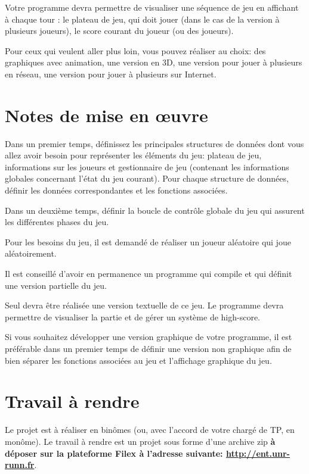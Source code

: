 \documentclass[10pt]{article}
\begin{document}
Votre programme devra permettre de visualiser une séquence de jeu en affichant à chaque tour : le plateau de jeu, qui doit jouer (dans le cas de la version à plusieurs joueurs), le score courant du joueur (ou des joueurs).

Pour ceux qui veulent aller plus loin, vous pouvez réaliser au choix: des graphiques avec animation, une version en 3D, une version pour jouer à plusieurs en réseau, une version pour jouer à plusieurs sur Internet.

\section{Notes de mise en {\oe}uvre}

Dans un premier temps, définissez les principales structures de données dont vous allez avoir besoin pour représenter les éléments du jeu: plateau de jeu, informations sur les joueurs et gestionnaire de jeu (contenant les informations globales concernant l'état du jeu courant). Pour chaque structure de données, définir les données correspondantes et les fonctions associées.

Dans un deuxième temps, définir la boucle de contrôle globale du jeu qui assurent les différentes phases du jeu.

Pour les besoins du jeu, il est demandé de réaliser un joueur aléatoire qui joue aléatoirement.

Il est conseillé d'avoir en permanence un programme qui compile et qui définit une version partielle du jeu.

Seul devra être réalisée une version textuelle de ce jeu. Le programme devra permettre de visualiser la partie et de gérer un système de high-score.

Si vous souhaitez développer une version graphique de votre programme, il est préférable dans un premier temps de définir une version non graphique afin de bien séparer les fonctions associées au jeu et l'affichage graphique du jeu.

\section{Travail à rendre}
Le projet est à réaliser en binômes (ou, avec l'accord de votre chargé de TP, en monôme). Le travail à rendre est un projet sous forme d'une archive zip {\bf à déposer sur la plateforme Filex à l'adresse suivante: \url{http://ent.unr-runn.fr}}. 
\end{document}
